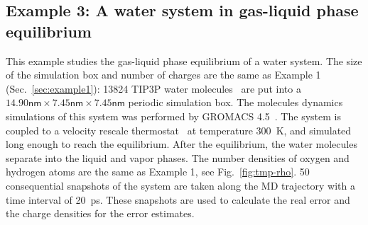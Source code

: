 \documentclass[aps,pre,preprint,unsortedaddress]{revtex4}
\begin{document}



\subsection{Example 3: A water system in gas-liquid phase equilibrium}
\label{sec:example3}

This example studies the gas-liquid phase equilibrium of a water
system. The size of the simulation box and number of charges are the
same as Example 1 (Sec.~\ref{sec:example1}): 13824 TIP3P water
molecules~\cite{jorgensen1983comparison} are put into a
$14.90\textsf{nm}\times 7.45\textsf{nm}\times 7.45\textsf{nm}$
periodic simulation box.  The molecules dynamics simulations of this
system was performed by GROMACS 4.5~\cite{hess2008gromacs}.  The system
is coupled to a velocity rescale thermostat~\cite{bussi2007canonical}
at temperature 300~\textsf{K}, and simulated long enough to reach the
equilibrium. After the equilibrium,
the water molecules separate into the liquid and vapor phases.
The number densities of oxygen and hydrogen atoms
are the same as Example 1, see Fig.~\ref{fig:tmp-rho}.
50 consequential snapshots of
the system are taken along the MD trajectory
with a time interval of 20~\textsf{ps}.  These
snapshots are used to calculate the real error and the charge densities
for the error estimates.
\end{document}
